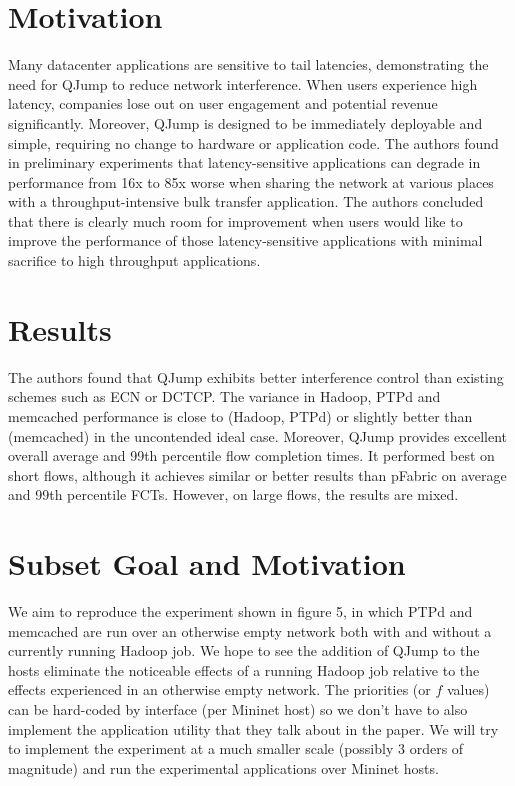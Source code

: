 \documentclass[12pt]{article}
\begin{document}
\section*{Motivation}
	Many datacenter applications are sensitive to tail latencies, demonstrating the need for QJump to reduce network interference. When users experience high latency, companies lose out on user engagement and potential revenue significantly. Moreover, QJump is designed to be immediately deployable and simple, requiring no change to hardware or application code. The authors found in preliminary experiments that latency-sensitive applications can degrade in performance from 16x to 85x worse when sharing the network at various places with a throughput-intensive bulk transfer application. The authors concluded that there is clearly much room for improvement when users would like to improve the performance of those latency-sensitive applications with minimal sacrifice to high throughput applications.
	
\section*{Results}
	The authors found that QJump exhibits better interference control than existing schemes such as ECN or DCTCP. The variance in Hadoop, PTPd and memcached performance is close to (Hadoop, PTPd) or slightly better than (memcached) in the uncontended ideal case. Moreover, QJump provides excellent overall average and 99th percentile flow completion times. It performed best on short flows, although it achieves similar or better results than pFabric on average and 99th percentile FCTs. However, on large flows, the results are mixed. 
	
\section*{Subset Goal and Motivation}
	We aim to reproduce the experiment shown in figure 5, in which PTPd and memcached are run over an otherwise empty network both with and without a currently running Hadoop job. We hope to see the addition of QJump to the hosts eliminate the noticeable effects of a running Hadoop job relative to the effects experienced in an otherwise empty network. The priorities (or $f$ values) can be hard-coded by interface (per Mininet host) so we don't have to also implement the application utility that they talk about in the paper. We will try to implement the experiment at a much smaller scale (possibly 3 orders of magnitude) and run the experimental applications over Mininet hosts.
	
\end{document}

